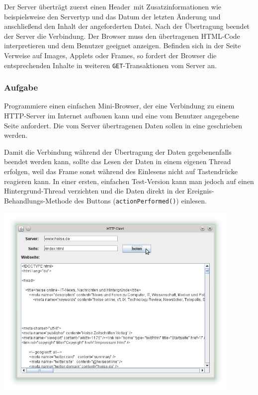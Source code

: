 Der Server überträgt zuerst einen \glqq Header\grqq\ mit Zusatzinformationen wie
beispielsweise den Servertyp und das Datum der letzten Änderung und
anschließend den Inhalt der angeforderten Datei. Nach der Übertragung beendet
der Server die Verbindung. Der Browser muss den übertragenen HTML-Code
interpretieren und dem Benutzer geeignet anzeigen. Befinden sich in der Seite
Verweise auf Images, Applets oder Frames, so fordert der Browser die
entsprechenden Inhalte in weiteren \lstinline|GET|-Transaktionen vom Server an.

\subsubsection{Aufgabe}

Programmiere einen einfachen Mini-Browser, der eine Verbindung zu einem
HTTP-Server im Internet aufbauen kann und eine vom Benutzer angegebene Seite
anfordert. Die vom Server übertragenen Daten sollen in eine 
geschrieben werden.

Damit die Verbindung während der Übertragung der Daten gegebenenfalls beendet
werden kann, sollte das Lesen der Daten in einem eigenen Thread erfolgen, weil
das Frame sonst während des Einlesens nicht auf Tastendrücke reagieren kann. In
einer ersten, einfachen Test-Version kann man jedoch auf einen
Hintergrund-Thread verzichten und die Daten direkt in der
Ereignis-Behandlungs-Methode des Buttons (\lstinline|actionPerformed()|)
einlesen.

\begin{center}
\includegraphics[width=0.89\textwidth]{./inf/SEKII/43_Java_ClientServer/HttpClient.png}
\end{center}

